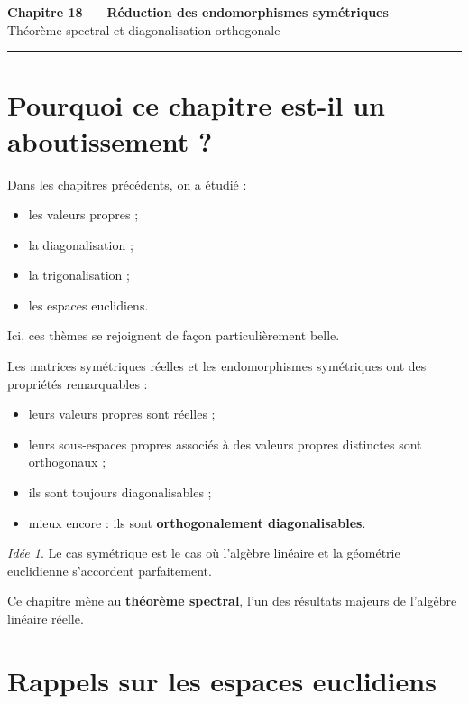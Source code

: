 \documentclass[11pt,a4paper]{article}
\theoremstyle{remark}
\newtheorem*{idee}{Idée}
\begin{document}
\begin{center}
    {\LARGE \textbf{Chapitre 18 --- Réduction des endomorphismes symétriques}}\\[0.4em]
    {\large Théorème spectral et diagonalisation orthogonale}
\end{center}

\hrule
\vspace{1em}

\tableofcontents

\newpage

\section{Pourquoi ce chapitre est-il un aboutissement ?}

Dans les chapitres précédents, on a étudié :
\begin{itemize}
    \item les valeurs propres ;
    \item la diagonalisation ;
    \item la trigonalisation ;
    \item les espaces euclidiens.
\end{itemize}

Ici, ces thèmes se rejoignent de façon particulièrement belle.

Les matrices symétriques réelles et les endomorphismes symétriques ont des propriétés remarquables :
\begin{itemize}
    \item leurs valeurs propres sont réelles ;
    \item leurs sous-espaces propres associés à des valeurs propres distinctes sont orthogonaux ;
    \item ils sont toujours diagonalisables ;
    \item mieux encore : ils sont \textbf{orthogonalement diagonalisables}.
\end{itemize}

\begin{idee}
Le cas symétrique est le cas où l’algèbre linéaire et la géométrie euclidienne s’accordent parfaitement.
\end{idee}

Ce chapitre mène au \textbf{théorème spectral}, l’un des résultats majeurs de l’algèbre linéaire réelle.

\section{Rappels sur les espaces euclidiens}
\end{document}
